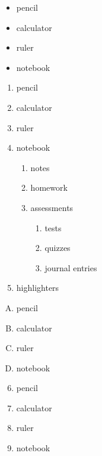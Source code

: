 \documentclass[11pt]{article}
\begin{document}
\begin{itemize}

	\item pencil
	\item calculator
	\item ruler
	\item notebook	

\end{itemize}

\vspace{1cm}

\begin{enumerate}

	\item pencil
	\item calculator
	\item ruler
	\item notebook
		\begin{enumerate}
		\item notes
		\item homework
		\item assessments
			\begin{enumerate}
			\item tests
			\item quizzes
			\item journal entries
			\end{enumerate}
		\end{enumerate}			

	\item highlighters

\end{enumerate}

\vspace{1cm}

\begin{enumerate}[A.]	%

	\item pencil
	\item calculator
	\item ruler
	\item notebook	
\end{enumerate}

\pagebreak

\begin{enumerate}\setcounter{enumi}{5}	%

	\item pencil
	\item calculator
	\item ruler
	\item notebook	
\end{enumerate}
\end{document}

